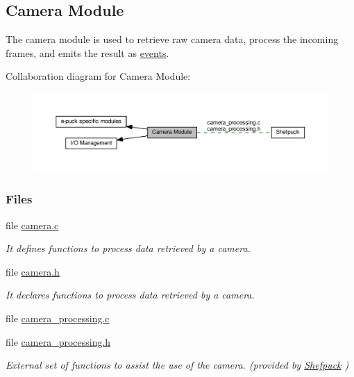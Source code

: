 \hypertarget{group__camera}{}\subsection{Camera Module}
\label{group__camera}


The camera module is used to retrieve raw camera data, process the incoming frames, and emits the result as \hyperlink{group__events}{events}.  


Collaboration diagram for Camera Module\+:\nopagebreak
\begin{figure}[H]
\begin{center}
\leavevmode
\includegraphics[width=350pt]{dc/d90/group__camera}
\end{center}
\end{figure}
\subsubsection*{Files}
\begin{DoxyCompactItemize}
\item 
file \hyperlink{camera_8c}{camera.\+c}
\begin{DoxyCompactList}\small\item\em It defines functions to process data retrieved by a camera. \end{DoxyCompactList}\item 
file \hyperlink{camera_8h}{camera.\+h}
\begin{DoxyCompactList}\small\item\em It declares functions to process data retrieved by a camera. \end{DoxyCompactList}\item 
file \hyperlink{camera__processing_8c}{camera\+\_\+processing.\+c}
\item 
file \hyperlink{camera__processing_8h}{camera\+\_\+processing.\+h}
\begin{DoxyCompactList}\small\item\em External set of functions to assist the use of the camera. (provided by \hyperlink{group__shefpuck}{Shefpuck} ) \end{DoxyCompactList}\end{DoxyCompactItemize}


